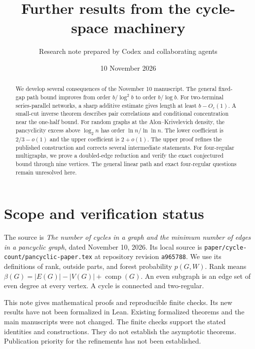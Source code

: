 \documentclass[11pt]{article}
\title{Further results from the cycle-space machinery}
\author{Research note prepared by Codex and collaborating agents}
\date{10 November 2026}
\begin{document}
\maketitle

\begin{abstract}
We develop several consequences of the November 10 manuscript.
The general fixed-gap path bound improves from order $b/\log^2 b$ to order $b/\log b$.
For two-terminal series-parallel networks, a sharp additive estimate gives length at least $b-O_\varepsilon(1)$.
A small-cut inverse theorem describes pair correlations and conditional concentration near the one-half bound.
For random graphs at the Alon--Krivelevich density, the pancyclicity excess above $\log_2 n$ has order $\ln n/\ln\ln n$.
The lower coefficient is $2/3-o(1)$ and the upper coefficient is $2+o(1)$.
The upper proof refines the published construction and corrects several intermediate statements.
For four-regular multigraphs, we prove a doubled-edge reduction and verify the exact conjectured bound through nine vertices.
The general linear path and exact four-regular questions remain unresolved here.
\end{abstract}

\section*{Scope and verification status}

The source is \emph{The number of cycles in a graph and the minimum number of edges in a pancyclic graph}, dated November 10, 2026.
Its local source is \texttt{paper/cycle-count/pancyclic-paper.tex} at repository revision \texttt{a965788}.
We use its definitions of rank, outside parts, and forest probability $p(G,W)$.
Rank means $\beta(G)=|E(G)|-|V(G)|+\operatorname{comp}(G)$.
An even subgraph is an edge set of even degree at every vertex.
A cycle is connected and two-regular.

This note gives mathematical proofs and reproducible finite checks.
Its new results have not been formalized in Lean.
Existing formalized theorems and the main manuscripts were not changed.
The finite checks support the stated identities and constructions.
They do not establish the asymptotic theorems.
Publication priority for the refinements has not been established.
\end{document}

